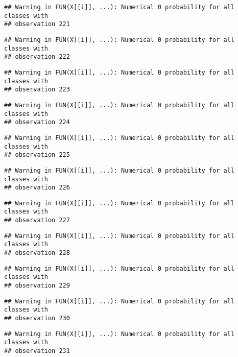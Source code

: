 \documentclass[
]{article}
\begin{document}
\begin{verbatim}
## Warning in FUN(X[[i]], ...): Numerical 0 probability for all classes with
## observation 221
\end{verbatim}

\begin{verbatim}
## Warning in FUN(X[[i]], ...): Numerical 0 probability for all classes with
## observation 222
\end{verbatim}

\begin{verbatim}
## Warning in FUN(X[[i]], ...): Numerical 0 probability for all classes with
## observation 223
\end{verbatim}

\begin{verbatim}
## Warning in FUN(X[[i]], ...): Numerical 0 probability for all classes with
## observation 224
\end{verbatim}

\begin{verbatim}
## Warning in FUN(X[[i]], ...): Numerical 0 probability for all classes with
## observation 225
\end{verbatim}

\begin{verbatim}
## Warning in FUN(X[[i]], ...): Numerical 0 probability for all classes with
## observation 226
\end{verbatim}

\begin{verbatim}
## Warning in FUN(X[[i]], ...): Numerical 0 probability for all classes with
## observation 227
\end{verbatim}

\begin{verbatim}
## Warning in FUN(X[[i]], ...): Numerical 0 probability for all classes with
## observation 228
\end{verbatim}

\begin{verbatim}
## Warning in FUN(X[[i]], ...): Numerical 0 probability for all classes with
## observation 229
\end{verbatim}

\begin{verbatim}
## Warning in FUN(X[[i]], ...): Numerical 0 probability for all classes with
## observation 230
\end{verbatim}

\begin{verbatim}
## Warning in FUN(X[[i]], ...): Numerical 0 probability for all classes with
## observation 231
\end{verbatim}
\end{document}
